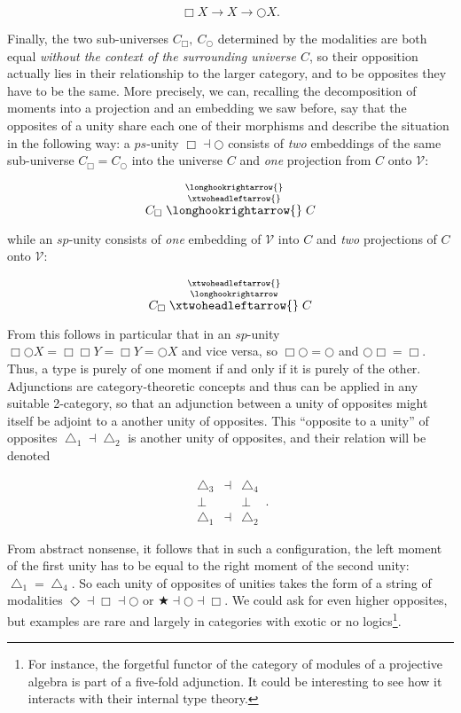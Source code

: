 \documentclass{article}
\begin{document}
$$\Box X\rightarrow X \rightarrow\bigcirc X.$$

Finally, the two sub-universes $C_\Box ,\ C_\bigcirc$ determined by the modalities are both equal \emph{without the context of the surrounding universe $C$}, so their opposition actually lies in their relationship to the larger category, and to be opposites they have to be the same. More precisely, we can, recalling the decomposition of moments into a projection and an embedding we saw before, say that the opposites of a unity share each one of their morphisms and describe the situation in the following way: a $ps$-unity $\Box\dashv\bigcirc$ consists of \emph{two} embeddings of the same sub-universe $C_\Box=C_\bigcirc$ into the universe $C$ and \emph{one} projection from $C$ onto $\mathcal{V}$:

$$C_\Box\stackrel{\longhookrightarrow{}}{\stackrel{\xtwoheadleftarrow{}}{\longhookrightarrow{}}}C$$

while an $sp$-unity consists of \emph{one} embedding of $\mathcal{V}$ into $C$ and \emph{two} projections of $C$ onto $\mathcal{V}$:

$$C_\Box\stackrel{\xtwoheadleftarrow{}}{\stackrel{\longhookrightarrow}{\xtwoheadleftarrow{}}}C$$

From this follows in particular that in an $sp$-unity $\Box\bigcirc X=\Box\Box Y=\Box Y= \bigcirc X$ and vice versa, so $\Box\bigcirc=\bigcirc$ and $\bigcirc\Box=\Box$. Thus, a type is purely of one moment if and only if it is purely of the other. \\

Adjunctions are category-theoretic concepts and thus can be applied in any suitable 2-category, so that an adjunction between a unity of opposites might itself be adjoint to a another unity of opposites\cite{Shu}. This ``opposite to a unity'' of opposites $\bigtriangleup_1\dashv\bigtriangleup_2$ is another unity of opposites, and their relation will be denoted 


$$
  \begin{array}{ccc}
    \bigtriangleup_3 &\dashv& \bigtriangleup_4
    \\
    \bot & & \bot
    \\
    \bigtriangleup_1 &\dashv& \bigtriangleup_2
    \end{array}
  \,.
$$

From abstract nonsense, it follows that in such a configuration, the left moment of the first unity has to be equal to the right moment of the second unity: $\bigtriangleup_1=\bigtriangleup_4$. So each unity of opposites of unities takes the form of a string of modalities $\Diamond\dashv\Box\dashv\bigcirc$ or $\bigstar\dashv\bigcirc\dashv\Box$. We could ask for even higher opposites, but examples are rare and largely in categories with exotic or no logics\footnote{For instance, the forgetful functor of the category of modules of a projective algebra is part of a five-fold adjunction. It could be interesting to see how it interacts with their internal type theory.}. \\
\end{document}
